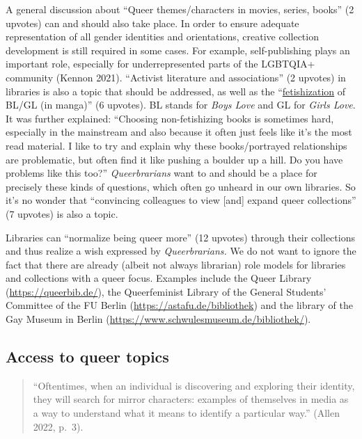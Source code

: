 \documentclass[a4paper,
fontsize=11pt,
oneside,
numbers=noperiodatend,
parskip=half-,
bibliography=totoc,
final
]{scrartcl}
\begin{document}
A general discussion about \enquote{Queer themes/characters in movies, series,
books} (2 upvotes) can and should also take place. In order to ensure
adequate representation of all gender identities and orientations,
creative collection development is still required in some cases. For
example, self-publishing plays an important role, especially for
underrepresented parts of the LGBTQIA+ community (Kennon 2021).
\enquote{Activist literature and associations} (2 upvotes) in libraries is also
a topic that should be addressed, as well as the
\enquote{\href{https://www.youthoutright.org/articles/fetishization-of-the-queer-community}{fetishization}
of BL/GL (in manga)} (6 upvotes). BL stands for \emph{Boys Love} and GL
for \emph{Girls Love}. It was further explained: \enquote{Choosing
non-fetishizing books is sometimes hard, especially in the mainstream
and also because it often just feels like it's the most
read material. I like to try and explain why these books/portrayed
relationships are problematic, but often find it like pushing a boulder
up a hill. Do you have problems like this too?} \emph{Queerbrarians}
want to and should be a place for precisely these kinds of questions,
which often go unheard in our own libraries. So it's no
wonder that \enquote{convincing colleagues to view {[}and{]} expand queer
collections} (7 upvotes) is also a topic.

Libraries can \enquote{normalize being queer more} (12 upvotes) through their
collections and thus realize a wish expressed by \emph{Queerbrarians.}
We do not want to ignore the fact that there are already (albeit not
always librarian) role models for libraries and collections with a queer
focus. Examples include the Queer Library (\url{https://queerbib.de/}),
the Queerfeminist Library of the General Students' Committee of the FU
Berlin (\url{https://astafu.de/bibliothek}) and the library of the Gay
Museum in Berlin (\url{https://www.schwulesmuseum.de/bibliothek/}).

\hypertarget{access-to-queer-topics}{%
\subsection{Access to queer topics}\label{access-to-queer-topics}}

\begin{quote}
\enquote{Oftentimes, when an individual is discovering and exploring their
identity, they will search for mirror characters: examples of themselves
in media as a way to understand what it means to identify a particular
way.} (Allen 2022, p.~3).
\end{quote}
\end{document}
